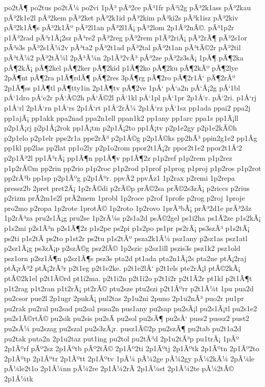 {po2tÃ¶
po2tus
po2tÃ¼
po2vi
1pÃ³
pÃ³2ce
pÃ³1fr
pÃ³i2g
pÃ³2k1ass
pÃ³2kau
pÃ³2k1e2l
pÃ³2kem
pÃ³2ket
pÃ³2k1id
pÃ³2kim
pÃ³ki2s
pÃ³k1isz
pÃ³2kiv
pÃ³2k1Ã¶s
pÃ³2k1Ãº
pÃ³2l1an
pÃ³2l1Ã¡
pÃ³2lom
2p1Ã³2nÃ©.
pÃ³1p2r
p1Ã³2rad
pÃ³r1Ã¡2sz
pÃ³re2
pÃ³2reg
pÃ³2rem
p1Ã³2riÃ¡
pÃ³2rÃ¶
pÃ³2s1or
pÃ³s3s
pÃ³2s1Ã¼2v
pÃ³ta2
pÃ³2t1ad
pÃ³2tal
pÃ³2t1an
pÃ³tÃ©2r
pÃ³2til
pÃ³tÃ¼2
pÃ³2tÃ¼l
2pÃ³Ã¼n
2p1Ã³2vÃ³
pÃ³2ze
pÃ³2z3sÃ¡
1pÃ¶
pÃ¶2ka
pÃ¶2kÃ¡
pÃ¶2kel
pÃ¶2ker
pÃ¶2kid
p1Ã¶2ko
pÃ¶2ku
pÃ¶2kÃº
pÃ¶2lye
2pÃ¶nt
pÃ¶2ra
p1Ã¶rdÃ¶
pÃ¶2res
3pÃ¶rg
pÃ¶2ro
pÃ¶2r1Å‘
pÃ¶2rÃº
2p1Ã¶ss
p1Ã¶tl
pÃ¶tty1in
2p1Ã¶tv
pÃ¶2ve
1pÅ‘
pÅ‘a2n
pÅ‘Ã¡2g
pÅ‘1bl
pÅ‘1dro
pÅ‘e2r
pÅ‘Ã©2h
pÅ‘Ã©2l
pÅ‘1kl
pÅ‘1pl
pÅ‘1pr
2p1Å‘r.
pÅ‘2ri.
p1Å‘rj
p1Å‘rl
2p1Å‘rn
p1Å‘rs
2p1Å‘rt
p1Å‘2rÃ¼
2p1Å‘rz
pÅ‘1sz
pp1ada
ppai2
ppa2j
pp1ajÃ¡
pp1akk
ppa2nad
ppa2n1ell
ppan1k2
pp1any
pp1arc
ppa1s
pp1Ã¡ll
p2p1Ã¡rj
p2p1Ã¡2rok
pp1Ã¡tm
p2p1Ã¡2to
pp1Ã¡tv
p2p1e2gy
p2p1e2kÃ©h
p2p1elo
p2p1elr
ppe2r1a
ppe2rÃ³
p2p1Ã©g
p2p1Ã©ks
pp2hÃ³
ppin2g1e2
pp1Ã­g
pp1kl
pp2las
pp2lat
pp1o2ly
p2p1o2rom
ppor2t1Ã¡2r
ppor2t1e2
ppor2t1Å‘2
p2p1Ã³2l
pp1Ã³rÃ¡
pp1Ã¶n
pp1Ã¶v
pp1Ã¶2z
p1p2ref
p1p2rem
p1p2rez
p1p2rÃ©m
pp2rin
pp2rio
p1p2roc
p1p2rod
p1prof
p1prog
p1proj
p1p2ros
p1p2rot
pp2rÃ³b
pp1sp
p2p1Ãºg
p2p1Ãºr.
ppvÃ­2
ppvÃ­z1
1p2rax
p2remi
1p2repa
pressz2b
2pret
pret2Ã¡
1p2rÃ©di
p2rÃ©p
prÃ©2sa
prÃ©2s3zÃ¡
p2riccs
p2rius
p2rizm
prÃ­2m1e2l
prÃ­2mem
1probl
1p2roce
p2rof
1profe
p2rog
p2roj
1proje
pro2mo
p2ropa
1p2rote
1protÃ©
1p2roto
1p2rovo
1prÃ³bÃ¡
prÃ³2d1e
prÃ³2dz
1p2rÃ³za
pru2s1Ã¡g
pru2se
1p2rÃ¼s
p2s1a2d
psÃ©2gel
ps1i2ha
ps1Ã­2ze
p1s2kÃ¡
p1s2mi
p2s1Ã³n
p2s1Ã¶2z
p1s2pe
ps2pi
p1s2po
ps1pr
ps2rÃ¡
ps3szÃ³
p1s2tÃ¡
ps2ti
p1s2tÃ­
ps2to
p1st2r
ps2tu
p1s2tÃº
psza2k1Ã¼
psz1any
p2sz1as
psz1atl
p2sz1Ã¡g
ps3zÃ¡p
p2szÃ©g
psz2fÃ©
1p2szic
p2sz1ill
pszis3s
psz1k2
psz1old
psz1orn
p2sz1Ã¶n
p2sz1Ã¶s
psz3s
pta2d
pt1ada
pta2n1Ã¡2s
pta2ne
ptÃ¡2raj
ptÃ¡rÃ³2
ptÃ¡2rÃ³r
p2t1eg
p2t1e2ke.
p2t1e2lÅ‘
p2t1els
pte2rÃ¡l
ptÃ©2kÃ¡
ptÃ©2k1el
p2t1Ã©rd
pt1i2ma.
p2t1i2n
p2t1i2o
p2t1i2r
p2t1Ã­2r
pt1kl
p2t1Ã¶t
p1t2rag
p1t2ran
p1t2rÃ¡
pt2rÃ©
ptu2sze
ptu2szi
p2t1Ãºrr
p2t1Ã¼t
1pu
pua2d
pu2csor
pue2l
2p1ugr
2pukÃ¡
pul2tas
2p1u2ni
2puno
2p1u2nÃ³
puo2r
pu1pr
pu2rak
pu2ral
pu2sad
pu2sal
pusa2n
pus1any
pu2sap
pu2sÃ¡l
pu2s1Ã¡tl
pu2s1e2
pu2s1Ã©rtÃ©
pu2sik
pu2sis
pu2sÃ­
pu2sol
pu2sÃ¶
pu2sÅ‘
puss2
pussz2
pust2
pu2sÃ¼
pu2szag
pu2szal
pu2s3zÃ¡r.
pusz1Ã©2p
pu2szÃ¶
pu2tab
pu2t1a2d
pu2tak
puta2n
2p1u2taz
put1ing
pu2tol
pu2tÃ³d
2p1u2tÃ³p
pu1trÃ¡
1pÃº
2p1Ãºrf
pÃº2sz
2p1Ãºtb
pÃº2tÃ©
2p1Ãº2ti
2p1Ãºtj
2p1Ãºtk
2p1Ãºtn
2p1Ãº2to
2p1Ãºtp
2p1Ãºtr
2p1Ãºtt
2p1Ãºtv
1pÃ¼
pÃ¼2ge
pÃ¼2gy
pÃ¼2kÃ¼
2pÃ¼le
pÃ¼le2t1o
2p1Ã¼nn
pÃ¼2re
2p1Ã¼2rÃ­
2p1Ã¼st
2p1Ã¼2te
pÃ¼2tÃ©
2p1Ã¼tk
}
